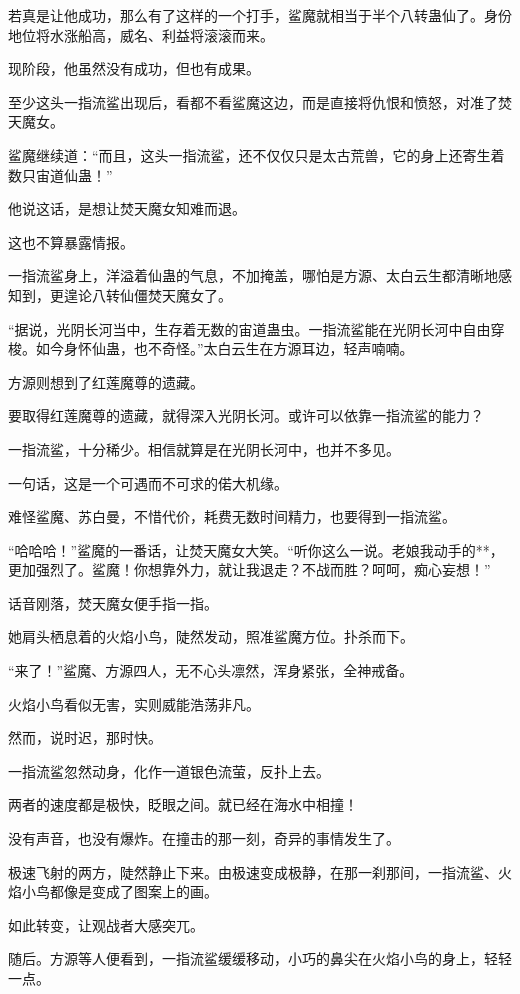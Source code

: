 \begin{this_body}
若真是让他成功，那么有了这样的一个打手，鲨魔就相当于半个八转蛊仙了。身份地位将水涨船高，威名、利益将滚滚而来。

现阶段，他虽然没有成功，但也有成果。

至少这头一指流鲨出现后，看都不看鲨魔这边，而是直接将仇恨和愤怒，对准了焚天魔女。

鲨魔继续道：“而且，这头一指流鲨，还不仅仅只是太古荒兽，它的身上还寄生着数只宙道仙蛊！”

他说这话，是想让焚天魔女知难而退。

这也不算暴露情报。

一指流鲨身上，洋溢着仙蛊的气息，不加掩盖，哪怕是方源、太白云生都清晰地感知到，更遑论八转仙僵焚天魔女了。

“据说，光阴长河当中，生存着无数的宙道蛊虫。一指流鲨能在光阴长河中自由穿梭。如今身怀仙蛊，也不奇怪。”太白云生在方源耳边，轻声喃喃。

方源则想到了红莲魔尊的遗藏。

要取得红莲魔尊的遗藏，就得深入光阴长河。或许可以依靠一指流鲨的能力？

一指流鲨，十分稀少。相信就算是在光阴长河中，也并不多见。

一句话，这是一个可遇而不可求的偌大机缘。

难怪鲨魔、苏白曼，不惜代价，耗费无数时间精力，也要得到一指流鲨。

“哈哈哈！”鲨魔的一番话，让焚天魔女大笑。“听你这么一说。老娘我动手的**，更加强烈了。鲨魔！你想靠外力，就让我退走？不战而胜？呵呵，痴心妄想！”

话音刚落，焚天魔女便手指一指。

她肩头栖息着的火焰小鸟，陡然发动，照准鲨魔方位。扑杀而下。

“来了！”鲨魔、方源四人，无不心头凛然，浑身紧张，全神戒备。

火焰小鸟看似无害，实则威能浩荡非凡。

然而，说时迟，那时快。

一指流鲨忽然动身，化作一道银色流萤，反扑上去。

两者的速度都是极快，眨眼之间。就已经在海水中相撞！

没有声音，也没有爆炸。在撞击的那一刻，奇异的事情发生了。

极速飞射的两方，陡然静止下来。由极速变成极静，在那一刹那间，一指流鲨、火焰小鸟都像是变成了图案上的画。

如此转变，让观战者大感突兀。

随后。方源等人便看到，一指流鲨缓缓移动，小巧的鼻尖在火焰小鸟的身上，轻轻一点。


\end{this_body}
